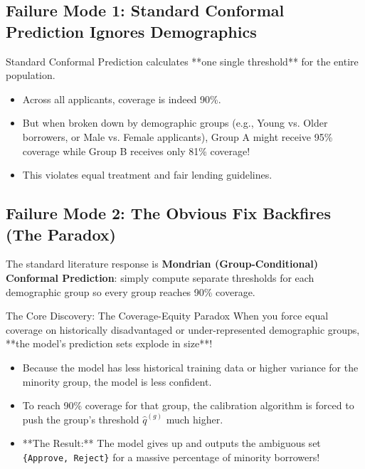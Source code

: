 \documentclass[11pt,a4paper]{article}
\begin{document}
\subsection{Failure Mode 1: Standard Conformal Prediction Ignores Demographics}
Standard Conformal Prediction calculates **one single threshold** for the entire population.
\begin{itemize}[leftmargin=1.5em]
    \item Across all applicants, coverage is indeed 90\%.
    \item But when broken down by demographic groups (e.g., Young vs. Older borrowers, or Male vs. Female applicants), Group A might receive 95\% coverage while Group B receives only 81\% coverage!
    \item This violates equal treatment and fair lending guidelines.
\end{itemize}

\subsection{Failure Mode 2: The Obvious Fix Backfires (The Paradox)}
The standard literature response is \textbf{Mondrian (Group-Conditional) Conformal Prediction}: simply compute separate thresholds for each demographic group so every group reaches 90\% coverage.

\begin{paradoxbox}{The Core Discovery: The Coverage-Equity Paradox}
When you force equal coverage on historically disadvantaged or under-represented demographic groups, **the model's prediction sets explode in size**!
\begin{itemize}[leftmargin=1.5em]
    \item Because the model has less historical training data or higher variance for the minority group, the model is less confident.
    \item To reach 90\% coverage for that group, the calibration algorithm is forced to push the group's threshold $\hat{q}^{(g)}$ much higher.
    \item **The Result:** The model gives up and outputs the ambiguous set \texttt{\{Approve, Reject\}} for a massive percentage of minority borrowers!
\end{itemize}
\end{paradoxbox}
\end{document}
